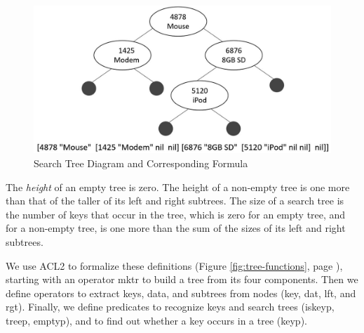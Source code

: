 \begin{figure}
\begin{center}
\includegraphics[scale=1]{images-cmyk/searchtree}
\end{center}
\caption{Search Tree Diagram and Corresponding Formula}
\label{fig:searchtree-diagram}
\end{figure}

\label{height-def}
The \emph{height} of an empty tree is zero.
The height of a non-empty tree is one more than that of the
taller of its left and right subtrees.
The size of a search tree is the number of keys that occur in the tree,
which is zero for an empty tree, and
for a non-empty tree, is one more than the sum
of the sizes of its left and right subtrees.

We use ACL2 to formalize these definitions
(Figure \ref{fig:tree-functions}, page \pageref{fig:tree-functions}),
starting with an operator \textsf{mktr} to build a tree from its four components.
Then we define operators to extract keys, data, and subtrees from nodes
(\textsf{key}, \textsf{dat}, \textsf{lft}, and \textsf{rgt}).
Finally, we define predicates to recognize keys and search trees
(\textsf{iskeyp}, \textsf{treep}, \textsf{emptyp}),
and to find out whether a key occurs in a tree (\textsf{keyp}).

